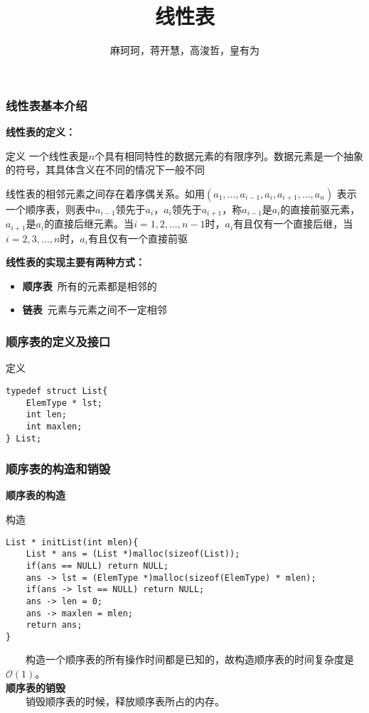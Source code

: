 \documentclass{beamer}
\author{麻珂珂，蒋开慧，高浚哲，皇有为}
\institute{XUPT}
\title{线性表}
\begin{document}
	
	\frame{\titlepage}
	
	\begin{frame}[c]\frametitle{线性表基本介绍}
		\textbf{线性表的定义：}
		\begin{block}{定义}
			一个线性表是$n$个具有相同特性的数据元素的有限序列。数据元素是一个抽象的符号，其具体含义在不同的情况下一般不同 \par
			线性表的相邻元素之间存在着序偶关系。如用$(a_1,\dots, a_{i - 1}, a_i, a_{i + 1},\dots,a_n)$ 表示一个顺序表，则表中$a_{i - 1}$领先于$a_i$，$a_i$领先于$a_{i+1}$，称$a_{i-1}$是$a_i$的直接前驱元素，$a_{i+1}$是$a_i$的直接后继元素。当$i=1,2,\dots,n-1$时，$a_i$有且仅有一个直接后继，当$i=2,3,\dots,n$时，$a_i$有且仅有一个直接前驱
		\end{block}
		\textbf{线性表的实现主要有两种方式：}
		\begin{itemize}
			\item \textbf{顺序表}\ 所有的元素都是相邻的
			\item \textbf{链表}\ 元素与元素之间不一定相邻
		\end{itemize}
	\end{frame}
	
	\begin{frame}[fragile]\frametitle{顺序表的定义及接口}
		\begin{block}{定义}
\begin{verbatim}
typedef struct List{
    ElemType * lst;
    int len;
    int maxlen;
} List;
\end{verbatim}
		\end{block}
	\end{frame}

	\begin{frame}[fragile]\frametitle{顺序表的构造和销毁}
		\textbf{顺序表的构造}
		\begin{block}{构造}
\begin{verbatim}
List * initList(int mlen){
    List * ans = (List *)malloc(sizeof(List));
    if(ans == NULL) return NULL;
    ans -> lst = (ElemType *)malloc(sizeof(ElemType) * mlen);
    if(ans -> lst == NULL) return NULL;
    ans -> len = 0;
    ans -> maxlen = mlen;
    return ans;
}
\end{verbatim}
		\end{block}
		\ \ \ \ 构造一个顺序表的所有操作时间都是已知的，故构造顺序表的时间复杂度是$\mathcal{O}(1)$。\\
		\textbf{顺序表的销毁}\\
		\ \ \ \ 销毁顺序表的时候，释放顺序表所占的内存。
	\end{frame}
\end{document}
